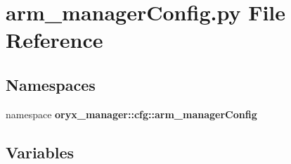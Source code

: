 \section{arm\-\_\-manager\-Config.\-py \-File \-Reference}
\label{arm__managerConfig_8py}
\subsection*{\-Namespaces}
\begin{DoxyCompactItemize}
\item 
namespace {\bf oryx\-\_\-manager\-::cfg\-::arm\-\_\-manager\-Config}
\end{DoxyCompactItemize}
\subsection*{\-Variables}
